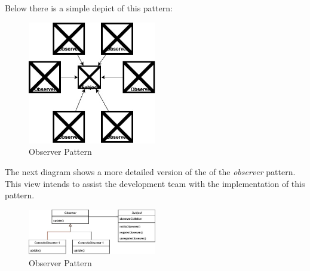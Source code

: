 Below there is a simple depict of this pattern:
\begin{figure}[H]
    \centering
    \includegraphics[width=0.5\textwidth]{assets/observer.jpg}
    \caption{Observer Pattern}
    \label{fig:simple_observer}
\end{figure}

The next diagram shows a more detailed version of the of the \textit{observer} pattern. This view intends to assist the development
team with the implementation of this pattern.

\begin{figure}[H]
    \centering
    \includegraphics[width=0.5\textwidth]{assets/class_observer.jpg}
    \caption{Observer Pattern}
    \label{fig:class_observer}
\end{figure}

